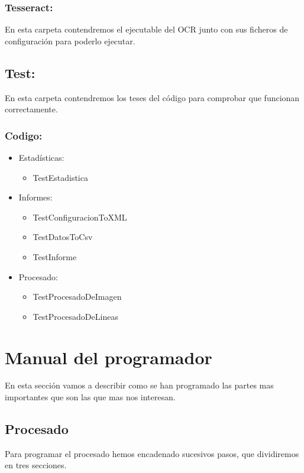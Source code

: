 \subsubsection{Tesseract:}
En esta carpeta contendremos el ejecutable del OCR junto con sus ficheros de configuración para poderlo ejecutar.

\subsection{Test:}
En esta carpeta contendremos los teses del código para comprobar que funcionan correctamente.
\subsubsection{Codigo:}
\begin{itemize}
	\item Estadísticas:
		\begin{itemize}
			\item TestEstadistica
		\end{itemize}
	\item Informes:
		\begin{itemize}
			\item TestConfiguracionToXML
			\item TestDatosToCsv
			\item TestInforme
		\end{itemize}
	\item Procesado:
		\begin{itemize}
			\item TestProcesadoDeImagen
			\item TestProcesadoDeLineas
		\end{itemize}
\end{itemize}

\section{Manual del programador}
En esta sección vamos a describir como se han programado las partes mas importantes que son las que mas nos interesan.
\subsection{Procesado}
Para programar el procesado hemos encadenado sucesivos pasos, que dividiremos en tres secciones.

